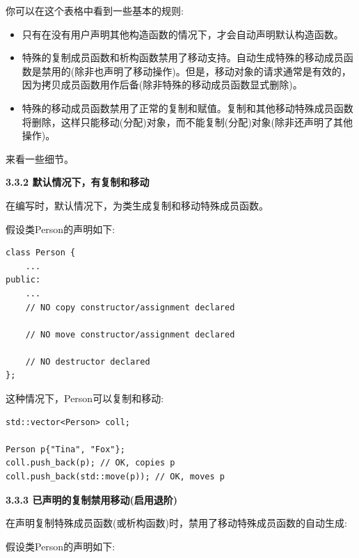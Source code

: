 你可以在这个表格中看到一些基本的规则:\par

\begin{itemize}
	\item 只有在没有用户声明其他构造函数的情况下，才会自动声明默认构造函数。
	\item 特殊的复制成员函数和析构函数禁用了移动支持。自动生成特殊的移动成员函数是禁用的(除非也声明了移动操作)。但是，移动对象的请求通常是有效的，因为拷贝成员函数用作后备(除非特殊的移动成员函数显式删除)。
	\item 特殊的移动成员函数禁用了正常的复制和赋值。复制和其他移动特殊成员函数将删除，这样只能移动(分配)对象，而不能复制(分配)对象(除非还声明了其他操作)。
\end{itemize}

来看一些细节。\par

\hspace*{\fill} \par %
\textbf{3.3.2 默认情况下，有复制和移动}

在编写时，默认情况下，为类生成复制和移动特殊成员函数。\par

假设类Person的声明如下:\par

\begin{lstlisting}[caption={}]
class Person {
	...
public:
	...
	// NO copy constructor/assignment declared
	
	// NO move constructor/assignment declared
	
	// NO destructor declared
};
\end{lstlisting}

这种情况下，Person可以复制和移动:\par

\begin{lstlisting}[caption={}]
std::vector<Person> coll;

Person p{"Tina", "Fox"};
coll.push_back(p); // OK, copies p
coll.push_back(std::move(p)); // OK, moves p
\end{lstlisting}

\hspace*{\fill} \par %
\textbf{3.3.3 已声明的复制禁用移动(启用退阶)}

在声明复制特殊成员函数(或析构函数)时，禁用了移动特殊成员函数的自动生成:\par

假设类Person的声明如下:\par

